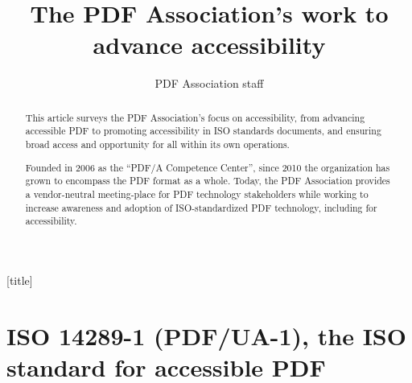 \documentclass[12pt,a4paper]{article}
\title{The PDF Association’s work to advance accessibility}
\author{PDF Association staff}
\begin{document}
[title]{%
}


\maketitle



\begin{abstract}
This article surveys the PDF Association's focus on accessibility, from
advancing accessible PDF to promoting accessibility in ISO standards
documents, and ensuring broad access and opportunity for all within its
own operations.

Founded in 2006 as the ``PDF/A Competence Center'', since 2010 the
organization has grown to encompass the PDF format as a whole. Today,
the PDF Association provides a vendor-neutral meeting-place for PDF
technology stakeholders while working to increase awareness and adoption
of ISO-standardized PDF technology, including for accessibility.
\end{abstract}

\section{ISO 14289-1 (PDF/UA-1), the ISO standard for accessible
PDF}\label{iso-14289-1-pdfua-1-the-iso-standard-for-accessible-pdf}
\end{document}
